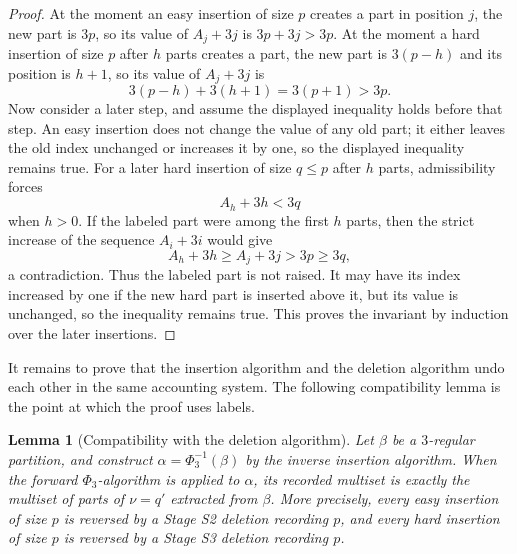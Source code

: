 \documentclass[11pt]{amsart}
\newtheorem{lemma}[theorem]{Lemma}
\theoremstyle{definition}
\theoremstyle{remark}
\begin{document}
\begin{proof}
At the moment an easy insertion of size $p$ creates a part in position $j$, the new part is $3p$, so its value of $A_j+3j$ is $3p+3j>3p$.  At the moment a hard insertion of size $p$ after $h$ parts creates a part, the new part is $3(p-h)$ and its position is $h+1$, so its value of $A_j+3j$ is
\[
        3(p-h)+3(h+1)=3(p+1)>3p.
\]
Now consider a later step, and assume the displayed inequality holds before that step.  An easy insertion does not change the value of any old part; it either leaves the old index unchanged or increases it by one, so the displayed inequality remains true.  For a later hard insertion of size $q\le p$ after $h$ parts, admissibility forces
\[
        A_h+3h<3q
\]
when $h>0$.  If the labeled part were among the first $h$ parts, then the strict increase of the sequence $A_i+3i$ would give
\[
        A_h+3h\ge A_j+3j>3p\ge3q,
\]
a contradiction.  Thus the labeled part is not raised.  It may have its index increased by one if the new hard part is inserted above it, but its value is unchanged, so the inequality remains true.  This proves the invariant by induction over the later insertions.
\end{proof}

It remains to prove that the insertion algorithm and the deletion algorithm undo each other in the same accounting system.  The following compatibility lemma is the point at which the proof uses labels.

\begin{lemma}[Compatibility with the deletion algorithm]\label{lem:compatibility}
Let $\beta$ be a $3$-regular partition, and construct
$\alpha=\Phi_3^{-1}(\beta)$ by the inverse insertion algorithm.  When the
forward $\Phi_3$-algorithm is applied to $\alpha$, its recorded multiset is
exactly the multiset of parts of $\nu=q'$ extracted from $\beta$.  More
precisely, every easy insertion of size $p$ is reversed by a Stage S2 deletion
recording $p$, and every hard insertion of size $p$ is reversed by a Stage S3
deletion recording $p$.
\end{lemma}
\end{document}
